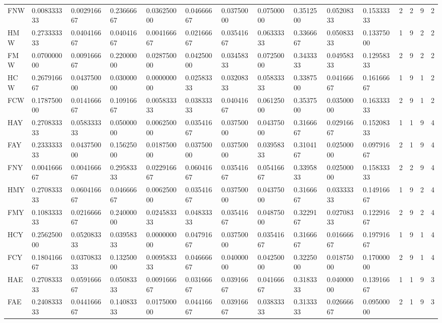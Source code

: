\documentclass[11pt]{article}
\begin{document}
\begin{tabular}{lllllllllllllll}
	 FNW & 0.008333333 & 0.002916667 & 0.23666667 & 0.036250000 & 0.04666667 & 0.03750000 & 0.07500000 & 0.3512500 & 0.05208333 & 0.15333333 & 2 & 2 & 9 & 2\\
	 HMW & 0.273333333 & 0.040416667 & 0.04041667 & 0.004166667 & 0.02166667 & 0.03541667 & 0.06333333 & 0.3366667 & 0.05083333 & 0.13375000 & 1 & 9 & 2 & 2\\
	 FMW & 0.070000000 & 0.009166667 & 0.22000000 & 0.028750000 & 0.04250000 & 0.03458333 & 0.07250000 & 0.3433333 & 0.04958333 & 0.12958333 & 2 & 9 & 2 & 2\\
	 HCW & 0.267916667 & 0.043750000 & 0.03000000 & 0.000000000 & 0.02583333 & 0.03208333 & 0.05833333 & 0.3387500 & 0.04166667 & 0.16166667 & 1 & 9 & 1 & 2\\
	 FCW & 0.178750000 & 0.014166667 & 0.10916667 & 0.005833333 & 0.03833333 & 0.04041667 & 0.06125000 & 0.3537500 & 0.03500000 & 0.16333333 & 2 & 9 & 1 & 2\\
	 HAY & 0.270833333 & 0.058333333 & 0.05000000 & 0.006250000 & 0.03541667 & 0.03750000 & 0.04375000 & 0.3166667 & 0.02916667 & 0.15208333 & 1 & 1 & 9 & 4\\
	 FAY & 0.233333333 & 0.043750000 & 0.15625000 & 0.018750000 & 0.03750000 & 0.03750000 & 0.03958333 & 0.3104167 & 0.02500000 & 0.09791667 & 2 & 1 & 9 & 4\\
	 FNY & 0.004166667 & 0.004166667 & 0.29583333 & 0.022916667 & 0.06041667 & 0.03541667 & 0.05416667 & 0.3395833 & 0.02500000 & 0.15833333 & 2 & 2 & 9 & 4\\
	 HMY & 0.270833333 & 0.060416667 & 0.04666667 & 0.006250000 & 0.03541667 & 0.03750000 & 0.04375000 & 0.3166667 & 0.03333333 & 0.14916667 & 1 & 9 & 2 & 4\\
	 FMY & 0.108333333 & 0.021666667 & 0.24000000 & 0.024583333 & 0.04833333 & 0.03541667 & 0.04875000 & 0.3229167 & 0.02708333 & 0.12291667 & 2 & 9 & 2 & 4\\
	 HCY & 0.256250000 & 0.052083333 & 0.03958333 & 0.000000000 & 0.04791667 & 0.03750000 & 0.03541667 & 0.3166667 & 0.01666667 & 0.19791667 & 1 & 9 & 1 & 4\\
	 FCY & 0.180416667 & 0.037083333 & 0.13250000 & 0.009583333 & 0.04666667 & 0.04000000 & 0.04250000 & 0.3225000 & 0.01875000 & 0.17000000 & 2 & 9 & 1 & 4\\
	 HAE & 0.270833333 & 0.059166667 & 0.05083333 & 0.009166667 & 0.03166667 & 0.03916667 & 0.04166667 & 0.3183333 & 0.04000000 & 0.13916667 & 1 & 1 & 9 & 3\\
	 FAE & 0.240833333 & 0.044166667 & 0.14083333 & 0.017500000 & 0.04416667 & 0.03916667 & 0.03833333 & 0.3133333 & 0.02666667 & 0.09500000 & 2 & 1 & 9 & 3\\

\end{tabular}
\end{document}
